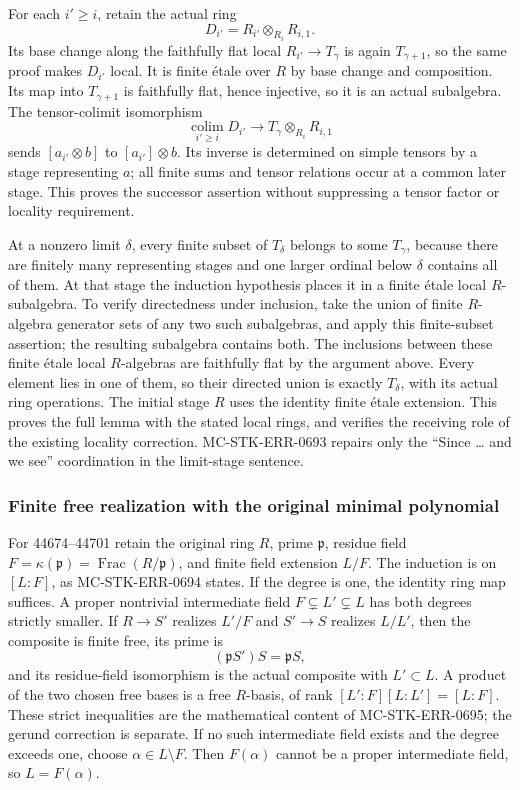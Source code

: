 For each \(i'\geq i\), retain the actual ring \[
 D_{i'}=R_{i'}\otimes_{R_i}R_{i,1}.
\] Its base change along the faithfully flat local \(R_{i'}\to T_\gamma\) is again \(T_{\gamma+1}\), so the same proof makes \(D_{i'}\) local. It is finite étale over \(R\) by base change and composition. Its map into \(T_{\gamma+1}\) is faithfully flat, hence injective, so it is an actual subalgebra. The tensor-colimit isomorphism \[
 \operatorname*{colim}_{i'\geq i}D_{i'}
      \longrightarrow T_\gamma\otimes_{R_i}R_{i,1}
\] sends \([a_{i'}\otimes b]\) to \([a_{i'}]\otimes b\). Its inverse is determined on simple tensors by a stage representing \(a\); all finite sums and tensor relations occur at a common later stage. This proves the successor assertion without suppressing a tensor factor or locality requirement.

At a nonzero limit \(\delta\), every finite subset of \(T_\delta\) belongs to some \(T_\gamma\), because there are finitely many representing stages and one larger ordinal below \(\delta\) contains all of them. At that stage the induction hypothesis places it in a finite étale local \(R\)-subalgebra. To verify directedness under inclusion, take the union of finite \(R\)-algebra generator sets of any two such subalgebras, and apply this finite-subset assertion; the resulting subalgebra contains both. The inclusions between these finite étale local \(R\)-algebras are faithfully flat by the argument above. Every element lies in one of them, so their directed union is exactly \(T_\delta\), with its actual ring operations. The initial stage \(R\) uses the identity finite étale extension. This proves the full lemma with the stated local rings, and verifies the receiving role of the existing locality correction. MC-STK-ERR-0693 repairs only the ``Since \ldots{} and we see'' coordination in the limit-stage sentence.

\subsubsection{Finite free realization with the original minimal polynomial}\label{algebra-proof-064-finite-free-realization-with-the-original-minimal-polynomial}

For 44674--44701 retain the original ring \(R\), prime \(\mathfrak p\), residue field \(F=\kappa(\mathfrak p)=\operatorname{Frac}(R/\mathfrak p)\), and finite field extension \(L/F\). The induction is on \([L:F]\), as MC-STK-ERR-0694 states. If the degree is one, the identity ring map suffices. A proper nontrivial intermediate field \(F\subsetneq L'\subsetneq L\) has both degrees strictly smaller. If \(R\to S'\) realizes \(L'/F\) and \(S'\to S\) realizes \(L/L'\), then the composite is finite free, its prime is \[
 (\mathfrak pS')S=\mathfrak pS,
\] and its residue-field isomorphism is the actual composite with \(L'\subset L\). A product of the two chosen free bases is a free \(R\)-basis, of rank \([L':F][L:L']=[L:F]\). These strict inequalities are the mathematical content of MC-STK-ERR-0695; the gerund correction is separate. If no such intermediate field exists and the degree exceeds one, choose \(\alpha\in L\setminus F\). Then \(F(\alpha)\) cannot be a proper intermediate field, so \(L=F(\alpha)\).


